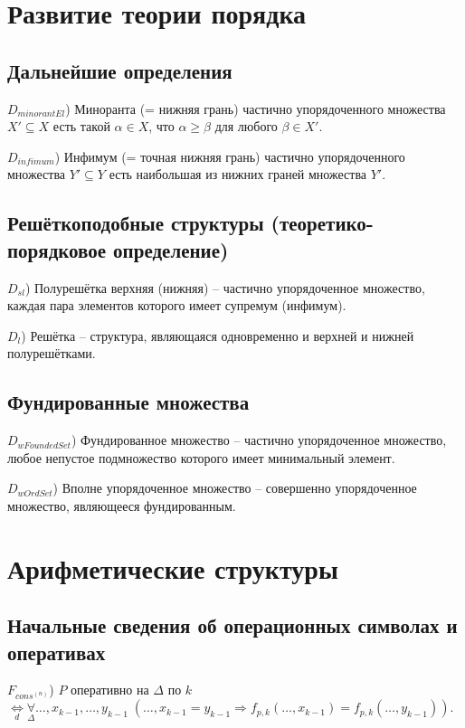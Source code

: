 \documentclass[a4paper]{article}
\newcommand{\Def}[0]{\underset{d}{\Leftrightarrow}}
\begin{document}
\section{Развитие теории порядка}

\subsection{Дальнейшие определения}

$D_{minorantEl}$) Миноранта (= нижняя грань) частично упорядоченного множества $X' \subseteq X$ есть такой $\alpha \in X$, что $\alpha \geqslant \beta$ для любого $\beta \in X'$.

$D_{infimum}$) Инфимум (= точная нижняя грань) частично упорядоченного множества $Y' \subseteq Y$ есть наибольшая из нижних граней множества $Y'$.

\subsection{Решёткоподобные структуры (теоретико-порядковое определение)}

$D_{sl}$) Полурешётка верхняя (нижняя) -- частично упорядоченное множество, каждая пара элементов которого имеет супремум (инфимум).

$D_{l}$) Решётка -- структура, являющаяся одновременно и верхней и нижней полурешётками.

\subsection{Фундированные множества}

$D_{wFoundedSet}$) Фундированное множество -- частично упорядоченное множество, любое непустое подмножество которого имеет минимальный элемент.

$D_{wOrdSet}$) Вполне упорядоченное множество -- совершенно упорядоченное множество, являющееся фундированным.

\clearpage


\section{Арифметические структуры}

\subsection{Начальные сведения об операционных символах и оперативах}

$F_{cons^{(n)}}$) $P$ оперативно на $\Delta$ по $k$ $\Def \underset{\Delta}{\forall} \dots , x_{k-1},\dots, y_{k-1}\; (\dots, x_{k-1} = y_{k-1} \Rightarrow f_{p, k}(\dots, x_{k-1}) = f_{p, k}(\dots, y_{k-1})).$
\end{document}
